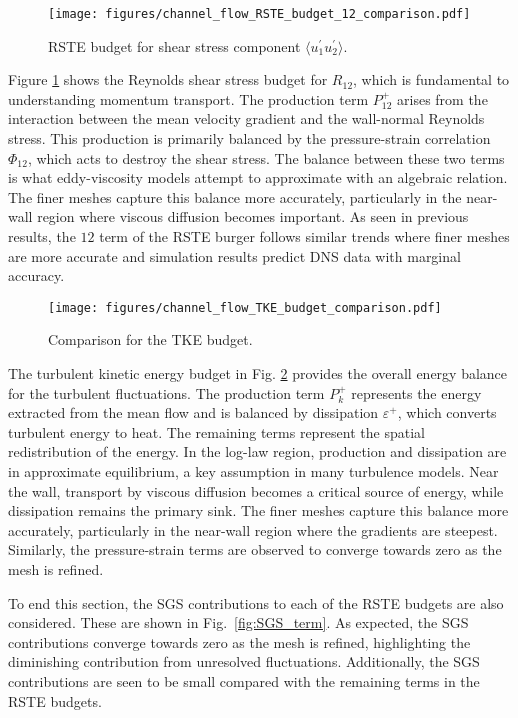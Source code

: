 \begin{figure}[ht]
    \centering
    \texttt{[image: figures/channel\_flow\_RSTE\_budget\_12\_comparison.pdf]}
    \caption{RSTE budget for shear stress component $\langle u^{\prime}_1 u^{\prime}_2 \rangle$.}
    \label{fig:chan_uv_RSTE}
\end{figure}

Figure \ref{fig:chan_uv_RSTE} shows the Reynolds shear stress budget for $R_{12}$, which is fundamental to understanding momentum transport. The production term $P^+_{12}$ arises from the interaction between the mean velocity gradient and the wall-normal Reynolds stress. This production is primarily balanced by the pressure-strain correlation $\Phi_{12}$, which acts to destroy the shear stress. The balance between these two terms is what eddy-viscosity models attempt to approximate with an algebraic relation. The finer meshes capture this balance more accurately, particularly in the near-wall region where viscous diffusion becomes important. As seen in previous results, the $12$ term of the RSTE burger follows similar trends where finer meshes are more accurate and simulation results predict DNS data with marginal accuracy.

\begin{figure}[ht]
    \centering
    \texttt{[image: figures/channel\_flow\_TKE\_budget\_comparison.pdf]}
    \caption{Comparison for the TKE budget.}
    \label{fig:chan_TKE_budget}
\end{figure}

The turbulent kinetic energy budget in Fig. \ref{fig:chan_TKE_budget} provides the overall energy balance for the turbulent fluctuations. The production term $P^+_k$ represents the energy extracted from the mean flow and is balanced by dissipation $\varepsilon^+$, which converts turbulent energy to heat. The remaining terms represent the spatial redistribution of the energy. In the log-law region, production and dissipation are in approximate equilibrium, a key assumption in many turbulence models. Near the wall, transport by viscous diffusion becomes a critical source of energy, while dissipation remains the primary sink. The finer meshes capture this balance more accurately, particularly in the near-wall region where the gradients are steepest.
Similarly, the pressure-strain terms are observed to converge towards zero as the mesh is refined.

To end this section, the SGS contributions to each of the RSTE budgets are also considered.
These are shown in Fig.~\ref{fig:SGS_term}.
As expected, the SGS contributions converge towards zero as the mesh is refined, highlighting the diminishing contribution from unresolved fluctuations.
Additionally, the SGS contributions are seen to be small compared with the remaining terms in the RSTE budgets.


